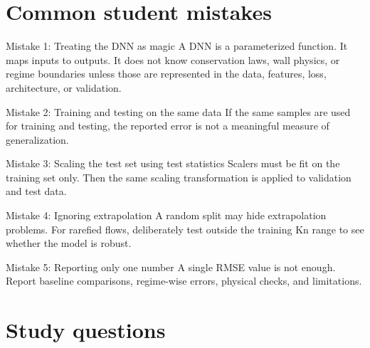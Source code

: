 \documentclass[11pt]{article}
\newcommand{\kn}{\mathrm{Kn}}
\begin{document}
\section{Common student mistakes}

\begin{warnbox}{Mistake 1: Treating the DNN as magic}
A DNN is a parameterized function.  It maps inputs to outputs.  It does not know conservation laws, wall physics, or regime boundaries unless those are represented in the data, features, loss, architecture, or validation.
\end{warnbox}

\begin{warnbox}{Mistake 2: Training and testing on the same data}
If the same samples are used for training and testing, the reported error is not a meaningful measure of generalization.
\end{warnbox}

\begin{warnbox}{Mistake 3: Scaling the test set using test statistics}
Scalers must be fit on the training set only.  Then the same scaling transformation is applied to validation and test data.
\end{warnbox}

\begin{warnbox}{Mistake 4: Ignoring extrapolation}
A random split may hide extrapolation problems.  For rarefied flows, deliberately test outside the training $\kn$ range to see whether the model is robust.
\end{warnbox}

\begin{warnbox}{Mistake 5: Reporting only one number}
A single RMSE value is not enough.  Report baseline comparisons, regime-wise errors, physical checks, and limitations.
\end{warnbox}

\section{Study questions}
\end{document}
